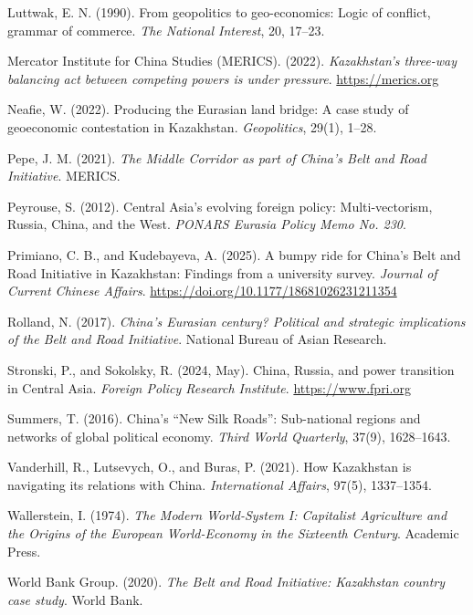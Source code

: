 \documentclass[12pt]{article}
\begin{document}
\noindent Luttwak, E. N. (1990). From geopolitics to geo-economics: Logic of conflict, grammar of commerce. \textit{The National Interest}, 20, 17--23.

\noindent Mercator Institute for China Studies (MERICS). (2022). \textit{Kazakhstan's three-way balancing act between competing powers is under pressure}. \url{https://merics.org}

\noindent Neafie, W. (2022). Producing the Eurasian land bridge: A case study of geoeconomic contestation in Kazakhstan. \textit{Geopolitics}, 29(1), 1--28.

\noindent Pepe, J. M. (2021). \textit{The Middle Corridor as part of China's Belt and Road Initiative}. MERICS.

\noindent Peyrouse, S. (2012). Central Asia's evolving foreign policy: Multi-vectorism, Russia, China, and the West. \textit{PONARS Eurasia Policy Memo No. 230}.

\noindent Primiano, C. B., and Kudebayeva, A. (2025). A bumpy ride for China's Belt and Road Initiative in Kazakhstan: Findings from a university survey. \textit{Journal of Current Chinese Affairs}. \url{https://doi.org/10.1177/18681026231211354}

\noindent Rolland, N. (2017). \textit{China's Eurasian century? Political and strategic implications of the Belt and Road Initiative}. National Bureau of Asian Research.

\noindent Stronski, P., and Sokolsky, R. (2024, May). China, Russia, and power transition in Central Asia. \textit{Foreign Policy Research Institute}. \url{https://www.fpri.org}

\noindent Summers, T. (2016). China's ``New Silk Roads'': Sub-national regions and networks of global political economy. \textit{Third World Quarterly}, 37(9), 1628--1643.

\noindent Vanderhill, R., Lutsevych, O., and Buras, P. (2021). How Kazakhstan is navigating its relations with China. \textit{International Affairs}, 97(5), 1337--1354.

\noindent Wallerstein, I. (1974). \textit{The Modern World-System I: Capitalist Agriculture and the Origins of the European World-Economy in the Sixteenth Century}. Academic Press.

\noindent World Bank Group. (2020). \textit{The Belt and Road Initiative: Kazakhstan country case study}. World Bank.
\end{document}
